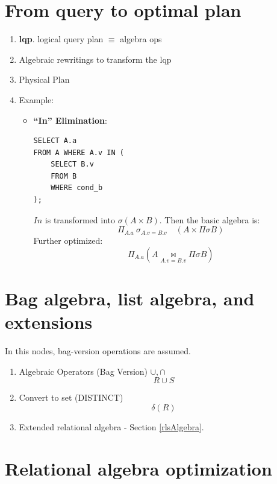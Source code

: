 \documentclass[a4paper]{report}
\begin{document}
\section{From query to optimal plan}
\begin{enumerate}
\item \textbf{lqp}. logical query plan $\equiv$ algebra ops 
\item Algebraic rewritings to transform the lqp
\item Physical Plan
\item Example:
\begin{itemize}
\item \textbf{``In'' Elimination}: 
\begin{lstlisting}
SELECT A.a
FROM A WHERE A.v IN (
    SELECT B.v
    FROM B
    WHERE cond_b
);
\end{lstlisting}
$In$ is transformed into $\sigma (A\times B)$. Then the basic algebra is:
$$
\Pi_{A.a}\ \sigma_{A.v=B.v}\quad (A \times \Pi \sigma B)
$$
Further optimized:
$$
\Pi_{A.a}(A \underset{A.v=B.v}\bowtie \Pi \sigma B)
$$

\end{itemize}
\end{enumerate}
\section{Bag algebra, list algebra, and extensions}
In this nodes, bag-version operations are assumed. 
\begin{enumerate}
\item Algebraic Operators (Bag Version) $\cup, \cap$
$$
R\cup S
$$
\item Convert to set (DISTINCT)
$$
\delta(R)
$$
\item Extended relational algebra - Section \ref{rlsAlgebra}.
\end{enumerate}
\section{Relational algebra optimization}
\end{document}
